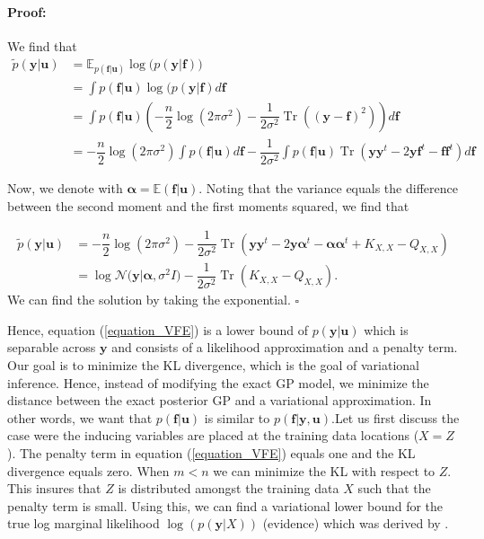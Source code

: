 \documentclass[12pt,a4paper,oneside]{book}
\newenvironment{proof}{\paragraph{Proof:}}{\hfill$\square$}
\DeclareMathOperator{\Tr}{Tr}
\begin{document}
\begin{proof}
We find that
\begin{align}
\tilde{p}(\bm{y}|\bm{u}) &=  \mathbb{E}_{p(\bm{f}|\bm{u})}\log{(p(\bm{y}|\bm{f})}) \nonumber \\
&= \int p(\bm{f}|\bm{u}) \log (p(\bm{y}|\bm{f})d \bm{f} \nonumber \\
&= \int p(\bm{f}|\bm{u}) \left( -\dfrac{n}{2} \log(2 \pi \sigma^2) - \dfrac{1}{2 \sigma^2} \Tr \left( ( \bm{y} - \bm{f})^2  \right) \right) d\bm{f} \nonumber \\
&=  - \dfrac{n}{2} \log (2 \pi \sigma^2) \int p(\bm{f} | \bm{u}) d\bm{f} - \dfrac{1}{2 \sigma^2} \int p(\bm{f} | \bm{u}) \Tr \left( \bm{y} \bm{y}^t - 2 \bm{y}\bm{f}^t - \bm{f}\bm{f}^t   \right) d\bm{f}
\end{align}

Now, we denote with $\bm{\alpha} = \mathbb{E}(\bm{f}|\bm{u})$. Noting that the variance equals the difference between the second moment and the first moments squared, we find that 

\begin{align}\label{equation_VFE}
\tilde{p}(\bm{y}|\bm{u}) &=  - \dfrac{n}{2} \log (2 \pi \sigma^2) - \dfrac{1}{2 \sigma^2} \Tr \left( \bm{y} \bm{y}^t - 2 \bm{y}\bm{\alpha}^t - \bm{\alpha}\bm{\alpha}^t + K_{X,X} - Q_{X,X}  \right) \nonumber \\ &= \log{ \mathcal{N}(\bm{y} | \bm{\alpha}, \sigma^2 I} ) - \dfrac{1}{2\sigma^2} \Tr (K_{X,X} - Q_{X,X}).
\end{align}
We can find the solution by taking the exponential. 
\end{proof}


Hence, equation (\ref{equation_VFE}) is a lower bound of $p(\bm{y}|\bm{u})$ which is separable across $\bm{y}$ and consists of a likelihood approximation and a penalty term. Our goal is to minimize the KL divergence, which is the goal of variational inference. Hence, instead of modifying the exact GP model, we minimize the distance between the exact posterior GP and a variational approximation. In other words, we want that $p(\bm{f}|\bm{u})$ is similar to $p(\bm{f}|\bm{y}, \bm{u})$.Let us first discuss the case were the inducing variables are placed at the training data locations ($X = Z$). The penalty term in equation (\ref{equation_VFE}) equals one and the KL divergence equals zero. When $m<n$ we can minimize the KL with respect to $Z$. This insures that $Z$ is distributed amongst the training data $X$ such that the penalty term is small. Using this, we can find a variational lower bound for the true log marginal likelihood $\log{(p(\bm{y}|X))} $ (evidence) which was derived by \cite{titsias2009variational}. 
\end{document}
